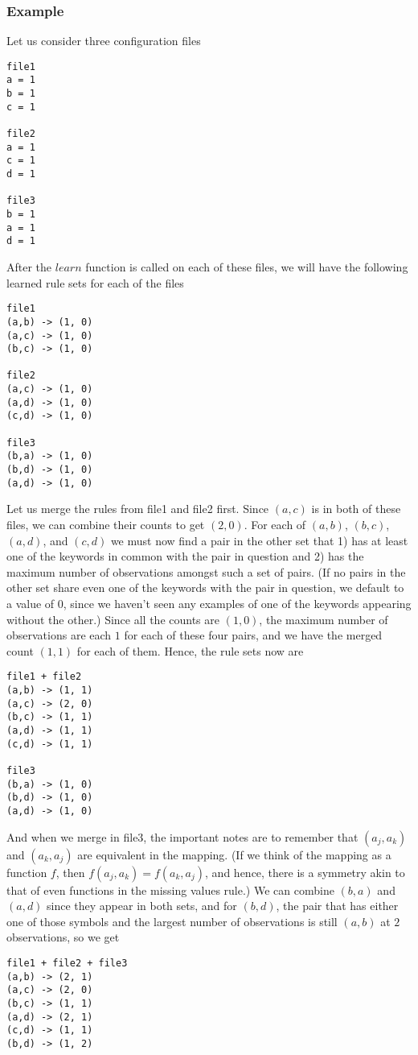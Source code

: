\documentclass[12pt]{article}
\begin{document}
\subsubsection{Example}
Let us consider three configuration files
\begin{lstlisting}
file1
a = 1
b = 1
c = 1

file2
a = 1
c = 1
d = 1

file3
b = 1
a = 1
d = 1
\end{lstlisting}
After the $learn$ function is called on each of these files, we will have the following learned rule sets for each of the files
\begin{lstlisting}
file1
(a,b) -> (1, 0)
(a,c) -> (1, 0)
(b,c) -> (1, 0)

file2
(a,c) -> (1, 0)
(a,d) -> (1, 0)
(c,d) -> (1, 0)

file3
(b,a) -> (1, 0)
(b,d) -> (1, 0)
(a,d) -> (1, 0)
\end{lstlisting}
Let us merge the rules from file1 and file2 first. Since $(a,c)$ is in both of these files, we can combine their counts to get $(2, 0)$. For each of $(a,b)$, $(b,c)$, $(a,d)$, and $(c,d)$ we must now find a pair in the other set that 1) has at least one of the keywords in common with the pair in question and 2) has the maximum number of observations amongst such a set of pairs. (If no pairs in the other set share even one of the keywords with the pair in question, we default to a value of $0$, since we haven't seen any examples of one of the keywords appearing without the other.) Since all the counts are $(1,0)$, the maximum number of observations are each $1$ for each of these four pairs, and we have the merged count $(1,1)$ for each of them. Hence, the rule sets now are
\begin{lstlisting}
file1 + file2
(a,b) -> (1, 1)
(a,c) -> (2, 0)
(b,c) -> (1, 1)
(a,d) -> (1, 1)
(c,d) -> (1, 1)

file3
(b,a) -> (1, 0)
(b,d) -> (1, 0)
(a,d) -> (1, 0)
\end{lstlisting}
And when we merge in file3, the important notes are to remember that $(a_j, a_k)$ and $(a_k, a_j)$ are equivalent in the mapping. (If we think of the mapping as a function $f$, then $f(a_j, a_k) = f(a_k, a_j)$, and hence, there is a symmetry akin to that of even functions in the missing values rule.) We can combine $(b,a)$ and $(a,d)$ since they appear in both sets, and for $(b,d)$, the pair that has either one of those symbols and the largest number of observations is still $(a,b)$ at $2$ observations, so we get
\begin{lstlisting}
file1 + file2 + file3
(a,b) -> (2, 1)
(a,c) -> (2, 0)
(b,c) -> (1, 1)
(a,d) -> (2, 1)
(c,d) -> (1, 1)
(b,d) -> (1, 2)
\end{lstlisting}
\end{document}
